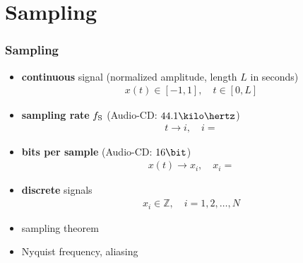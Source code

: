
\section{Sampling}

\begin{frame}
	\frametitle{Sampling}
	\begin{itemize}
		\item \textbf{continuous} signal (normalized amplitude, length $L$ in seconds)
			\begin{align*}
				x(t)\in[-1,1],\quad t\in[0,L]
			\end{align*}
		\item \textbf{sampling rate} $f_{\textrm S}$ (Audio-CD: $44.1\kilo\hertz$)
			\begin{align*}
				t\rightarrow i,\quad i=
			\end{align*}
		\item \textbf{bits per sample} (Audio-CD: $16\bit$)
			\begin{align*}
				x(t)\rightarrow x_i,\quad x_i=
			\end{align*}
		\item \textbf{discrete} signals
			\begin{align*}
				x_i\in\mathbb Z,\quad i=1,2,\ldots,N
			\end{align*}
		\item sampling theorem
		\item Nyquist frequency, aliasing
	\end{itemize}
\end{frame}

